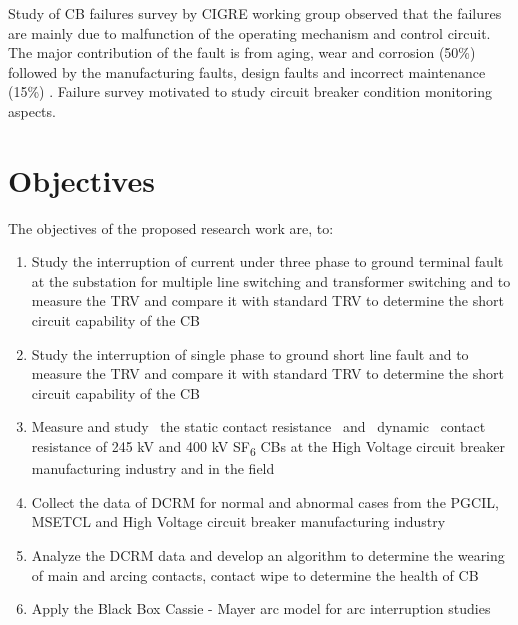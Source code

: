 Study of CB failures survey by CIGRE working group observed that the failures are mainly due to malfunction of the operating mechanism and control circuit. The major contribution of the fault is from aging, wear and corrosion (50\%) followed by the manufacturing faults, design faults and incorrect maintenance (15\%) \cite{janssen2014international}. Failure survey motivated to study circuit breaker condition monitoring aspects.

\clearpage
\section{Objectives}
The objectives of the proposed research work are, to:
\begin{enumerate}
\item  Study the interruption of current under three phase to ground terminal fault at the substation for multiple line switching and transformer switching and to measure the TRV and compare it with standard TRV to determine the short circuit capability of the CB

\item Study the interruption of single phase to ground short line fault and to measure the TRV and compare it with standard TRV to determine the short circuit capability of the CB

\item Measure and study~ the static contact resistance~ and~ dynamic~ contact resistance of 245 kV and 400 kV SF\textsubscript{6} CBs at the High Voltage circuit breaker manufacturing industry and in the field

\item Collect the data of DCRM for normal and abnormal cases from the PGCIL, MSETCL and High Voltage  circuit breaker manufacturing industry

\item Analyze the DCRM data and develop an algorithm to determine the wearing of main and arcing contacts, contact wipe to determine the health of CB

\item Apply the Black Box Cassie - Mayer arc model for arc interruption studies
\end{enumerate}

\clearpage
